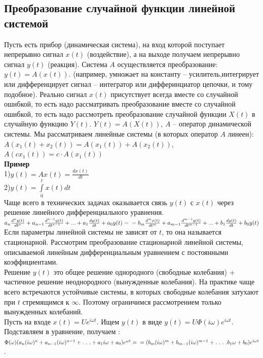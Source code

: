 \documentclass[russian, 12pt, fleqn]{article}
\begin{document}
\subsection{Преобразование случайной функции линейной системой}
Пусть есть прибор (динамическая система), на вход которой поступает непрерывно сигнал $x(t)$ (воздействие), а на выходе получаем непрерывно сигнал $y(t)$ (реакция). Система $A$ осуществляется преобразование: $y(t)=A(x(t))$. (например, умножает на константу -- усилитель,интегрирует или дифференцирует сигнал -- интегратор или дифферинциатор цепочки, и тому подобное). Реально сигнал $x(t)$ присутствует всегда вместе со случайной ошибкой, то есть надо рассматривать преобразование вместе со случайной ошибкой, то есть надо рассмотреть преобразование случайной функции $X(t)$ в случайную функцию $Y(t)$. $Y(t) = A(X(t))$, $A$ -- оператор динамической системы. Мы рассматриваем линейные системы (в которых оператор $A$ линеен): $A(x_1(t) + x_2(t)) =  A(x_1(t)) + A(x_2(t))$, $A(cx_1(t)) = c \cdot A(x_1(t))$\\
\textbf{Пример} \\
1)$y(t)=Ax(t) = \frac{dx(t)}{dt}$\\
2)$y(t) = \displaystyle{\int \limits_{0}^{t} } x(t)dt$\\
Чаще всего в технических задачах оказывается связь $y(t)$ с $x(t)$ через решение линейного дифференциального уравнения.\\
$a_n\frac{d^ny(t)}{dt^n} + a_{n - 1} \frac{d^{n - 1}y(t)}{dt^{n - 1}} + . . . +  a_1\frac{dy(t)}{dt} + a_0y(t) = \\ = b_m\frac{d^mx(t)}{dt^m} + a_{m - 1} \frac{d^{m - 1}y(t)}{dt^{m - 1}} + . . . +  b_1\frac{dy(t)}{dt} + b_0y(t)  $\\
Если параметры линейной системы не зависят от $t$, то она называется стационарной. Рассмотрим преобразование стационарной линейной системы, описываемой линейным дифференциальным уравнением с постоянными коэффициентами.\\
Решение $y(t)$  это  общее решение однородного (свободные колебания) + частичное решение неоднородного (вынужденные колебания). На практике чаще всего встречаются устойчивые системы, в которых свободные колебания затухают при $t$ стремящимся к $\infty$. Поэтому ограничимся рассмотрением только вынужденных колебаний.\\
Пусть на входе $x(t) = Ue^{i \omega t}$. Ищем $y(t)$ в виде $y(t) = U \Phi(i\omega) e^{i\omega t}$. Подставляем в уравнение, получаем : 
$\Phi(\omega) (a_n (i\omega)^n + a_{n-1} (i\omega)^{n-1} + .\ .\ . + a_1i\omega + a_0)e^{\omega t}  = \\ = (b_m(i\omega)^m  + b_{m - 1}(i\omega)^{m-1}  + .\ .\ .\ . b_1\omega + b_0) e^{i\omega t}$.\\
\end{document}
